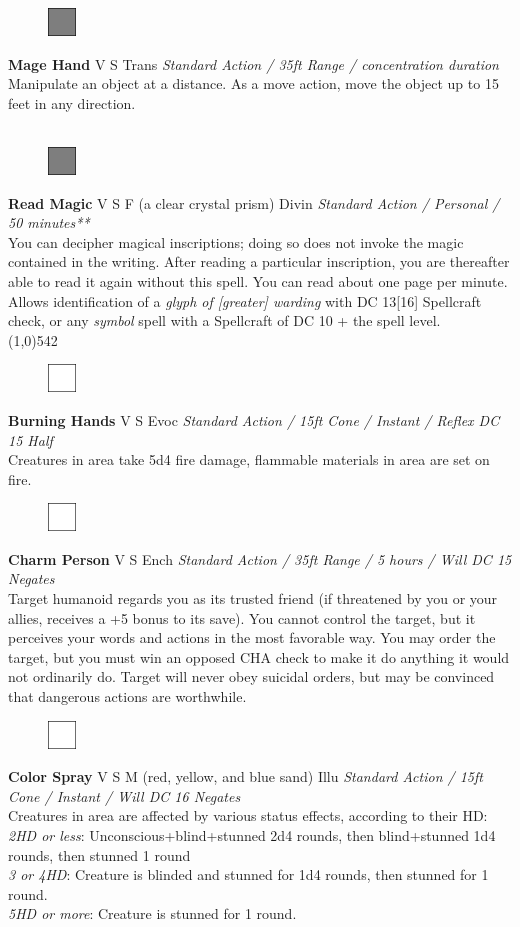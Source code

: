 \documentclass[letterpaper]{article}
\newcommand{\fullline}{\noindent\line(1,0){542} \\}
\newcommand{\spell}[7]{
\begin{figure}
\vspace{-13pt}
\ifstrequal{#2}{Full}{\includegraphics[width=2em]{Checkbox-Full}}{
                      \includegraphics[width=2em]{Checkbox}}
\ifstrequal{#7}{}{\vspace{-1em}}{\vspace{#7}}
\end{figure}
\noindent \textbf{#1} #3 {
    \ifstrequal{#4}{Conj}{\color{Plum}Conj}{%
    \ifstrequal{#4}{Divin}{\color{YellowOrange}Divin}{%
    \ifstrequal{#4}{Ench}{\color{VioletRed}Ench}{%
    \ifstrequal{#4}{Trans}{\color{LimeGreen}Trans}{%
    \ifstrequal{#4}{Evoc}{\color{RedOrange}Evoc}{%
    \ifstrequal{#4}{Illu}{\color{ProcessBlue}Illu}{%
    \ifstrequal{#4}{Abjur}{\color{CadetBlue}Abjur}{%
    \ifstrequal{#4}{Necro}{\color{Red}Necro}{%
}}}}}}}}}
{\footnotesize \emph{#5}} \\
#6
}
\begin{document}


\spell{Mage Hand}{Full}{V S}{Trans}{Standard Action / 35ft Range / concentration duration}{%
Manipulate an object at a distance. As a move action, move the object up to 15 feet in any direction.\\}{}\\[-2em] %

\spell{Read Magic}{Full}{V S F (a clear crystal prism)}{Divin}{Standard Action / Personal / 50 minutes**}{
You can decipher magical inscriptions; doing so does not invoke the magic contained in the writing.  After reading a particular inscription, you are thereafter able to read it again without this spell.  You can read about one page per minute. Allows identification of a \emph{glyph of [greater] warding} with DC 13[16] Spellcraft check, or any \emph{symbol} spell with a Spellcraft of DC 10 + the spell level.}{1em}\\[-2em] %

\fullline
\vspace{-1.25em}

\spell{Burning Hands}{}{V S}{Evoc}{Standard Action / 15ft Cone / Instant / Reflex DC 15 Half}{%
Creatures in area take 5d4 fire damage, flammable materials in area are set on fire.}{}\\[-1em] %

\spell{Charm Person}{}{V S}{Ench}{Standard Action / 35ft Range / 5 hours / Will DC 15 \nolinebreak Negates}{%
Target humanoid regards you as its trusted friend (if threatened by you or your allies, receives a +5 bonus to its save).  You cannot control the target, but it perceives your words and actions in the most favorable way.  You may order the target, but you must win an opposed CHA check to make it do anything it would not ordinarily do.  Target will never obey suicidal orders, but may be convinced that dangerous actions are worthwhile.}{1em} %

\spell{Color Spray}{}{V S M (red, yellow, and blue sand)}{Illu}{Standard Action / 15ft Cone / Instant / Will DC 16 Negates}{%
Creatures in area are affected by various status effects, according to their HD:\\
\emph{2HD or less}: Unconscious+blind+stunned 2d4 rounds, then blind+stunned 1d4 rounds, then stunned 1 round \\
\emph{3 or 4HD}: Creature is blinded and stunned for 1d4 rounds, then stunned for 1 round.\\
\emph{5HD or more}: Creature is stunned for 1 round.}{1em}
\end{document}

